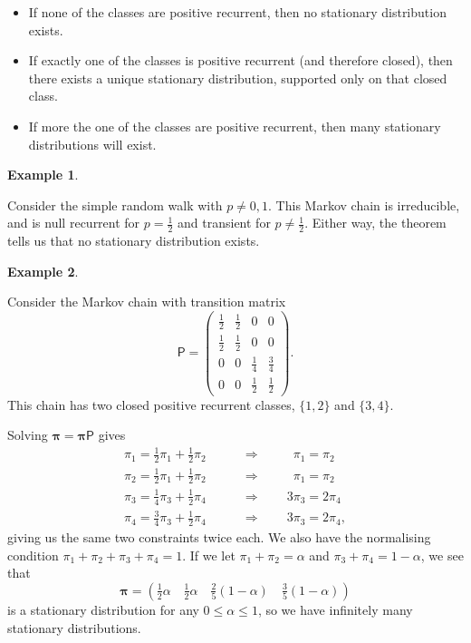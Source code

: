 \documentclass[
  a4paper,
]{article}
\providecommand{\tightlist}{%
  \setlength{\itemsep}{0pt}\setlength{\parskip}{0pt}}
\theoremstyle{definition}
\theoremstyle{definition}
\newtheorem{example}{Example}[section]
\theoremstyle{definition}
\theoremstyle{remark}
\begin{document}
\begin{itemize}
\tightlist
\item
  If none of the classes are positive recurrent, then no stationary distribution exists.
\item
  If exactly one of the classes is positive recurrent (and therefore closed), then there exists a unique stationary distribution, supported only on that closed class.
\item
  If more the one of the classes are positive recurrent, then many stationary distributions will exist.
\end{itemize}

\begin{example}
\protect\hypertarget{exm:stat-rw}{}\label{exm:stat-rw}

Consider the simple random walk with \(p \neq 0,1\). This Markov chain is irreducible, and is null recurrent for \(p = \frac12\) and transient for \(p \neq \frac12\). Either way, the theorem tells us that no stationary distribution exists.

\end{example}

\begin{example}
\protect\hypertarget{exm:stat-two}{}\label{exm:stat-two}

Consider the Markov chain with transition matrix
\[ \mathsf P = \begin{pmatrix} \frac12 & \frac12 & 0 & 0 \\
\frac12 & \frac12 & 0 & 0 \\
0 & 0 & \frac14 & \frac34\\
0 & 0 & \frac12 & \frac12\end{pmatrix} . \]
This chain has two closed positive recurrent classes, \(\{1,2\}\) and \(\{3,4\}\).

Solving \(\boldsymbol\pi = \boldsymbol\pi\mathsf P\) gives
\begin{align*}
    \pi_1 = \tfrac12 \pi_1 + \tfrac12\pi_2 \qquad &\Rightarrow \qquad \phantom{3}\pi_1 = \pi_2 \\
    \pi_2 = \tfrac12 \pi_1 + \tfrac12\pi_2 \qquad &\Rightarrow \qquad \phantom{3}\pi_1 = \pi_2 \\
    \pi_3 = \tfrac14 \pi_3 + \tfrac12\pi_4 \qquad &\Rightarrow \qquad 3\pi_3 = 2\pi_4 \\
    \pi_4 = \tfrac34 \pi_3 + \tfrac12\pi_4 \qquad &\Rightarrow \qquad 3\pi_3 = 2\pi_4 , 
\end{align*}
giving us the same two constraints twice each. We also have the normalising condition \(\pi_1 + \pi_2+\pi_3+\pi_4 = 1\). If we let \(\pi_1 + \pi_2 = \alpha\) and \(\pi_3 + \pi_4 = 1-\alpha\), we see that
\[ \boldsymbol\pi = \left(\tfrac12\alpha\quad \tfrac12\alpha\quad \tfrac25(1-\alpha)\quad \tfrac35(1-\alpha)\right) \]
is a stationary distribution for any \(0 \leq \alpha \leq 1\), so we have infinitely many stationary distributions.

\end{example}
\end{document}

